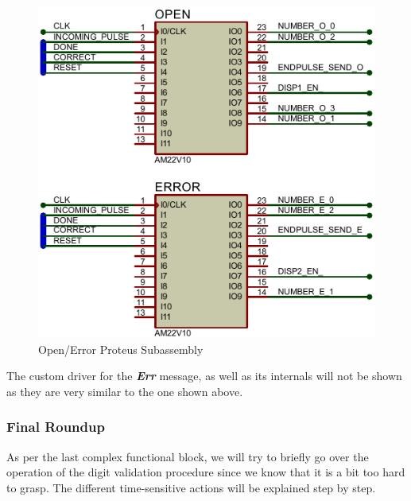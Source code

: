 \begin{figure}[H]
    \centering
    \includegraphics[scale = 1]{Graphics/OPEN-ERROR/OPEN_ERROR_PROTEUS.PDF}
    \caption{Open/Error Proteus Subassembly}
    \label{fig:OPEN_ERROR_PROTEUS}
\end{figure}

The custom driver for the \textbf{\textit{Err}} message, as well as its internals will not be shown as they are very similar to the one shown above.

\clearpage

\subsubsection{Final Roundup}

As per the last complex functional block, we will try to briefly go over the operation of the digit validation procedure since we know that it is a bit too hard to grasp. The different time-sensitive actions will be explained step by step.

